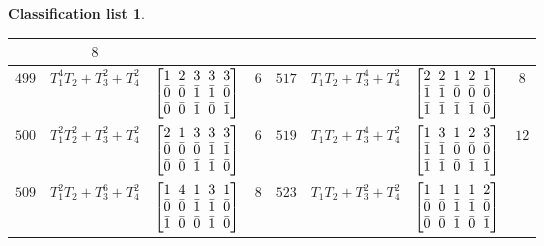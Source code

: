 \documentclass[10pt,a4paper]{amsart}
\theoremstyle{definition}
\newtheorem{class-list}[thm]{Classification list}
\numberwithin{equation}{section}
\begin{document}
\begin{class-list}
\begin{table}[t!]
\begin{tabu}{c|c|c|c||c|c|c|c}
&${8}$
\\
\hline
${499}$&${T_{1}^{4}T_{2}+T_{3}^{2}+T_{4}^{2}}$
&$\arraycolsep=1mm\begin{bmatrix}{1} & {2} & {3} & {3} & {3} \\ {\bar{0}} & {\bar{0}} & {\bar{1}} & {\bar{1}} & {\bar{0}} \\ {\bar{0}} & {\bar{0}} & {\bar{1}} & {\bar{0}} & {\bar{1}}\end{bmatrix}$
&${6}$
&${517}$&${T_{1}T_{2}+T_{3}^{4}+T_{4}^{2}}$
&$\arraycolsep=1mm\begin{bmatrix}{2} & {2} & {1} & {2} & {1} \\ {\bar{1}} & {\bar{1}} & {\bar{0}} & {\bar{0}} & {\bar{0}} \\ {\bar{1}} & {\bar{1}} & {\bar{1}} & {\bar{1}} & {\bar{0}}\end{bmatrix}$
&${8}$
\\
\hline
${500}$&${T_{1}^{2}T_{2}^{2}+T_{3}^{2}+T_{4}^{2}}$
&$\arraycolsep=1mm\begin{bmatrix}{2} & {1} & {3} & {3} & {3} \\ {\bar{0}} & {\bar{0}} & {\bar{0}} & {\bar{1}} & {\bar{1}} \\ {\bar{0}} & {\bar{0}} & {\bar{1}} & {\bar{1}} & {\bar{0}}\end{bmatrix}$
&${6}$
&${519}$&${T_{1}T_{2}+T_{3}^{4}+T_{4}^{2}}$
&$\arraycolsep=1mm\begin{bmatrix}{1} & {3} & {1} & {2} & {3} \\ {\bar{1}} & {\bar{1}} & {\bar{0}} & {\bar{0}} & {\bar{0}} \\ {\bar{1}} & {\bar{1}} & {\bar{0}} & {\bar{1}} & {\bar{1}}\end{bmatrix}$
&${12}$
\\
\hline
${509}$&${T_{1}^{2}T_{2}+T_{3}^{6}+T_{4}^{2}}$
&$\arraycolsep=1mm\begin{bmatrix}{1} & {4} & {1} & {3} & {1} \\ {\bar{0}} & {\bar{0}} & {\bar{1}} & {\bar{1}} & {\bar{0}} \\ {\bar{1}} & {\bar{0}} & {\bar{0}} & {\bar{1}} & {\bar{0}}\end{bmatrix}$
&${8}$
&${523}$&${T_{1}T_{2}+T_{3}^{2}+T_{4}^{2}}$
&$\arraycolsep=1mm\begin{bmatrix}{1} & {1} & {1} & {1} & {2} \\ {\bar{0}} & {\bar{0}} & {\bar{1}} & {\bar{1}} & {\bar{0}} \\ {\bar{0}} & {\bar{0}} & {\bar{1}} & {\bar{0}} & {\bar{1}}\end{bmatrix}$

\end{tabu}
\end{table}
\end{class-list}
\end{document}
